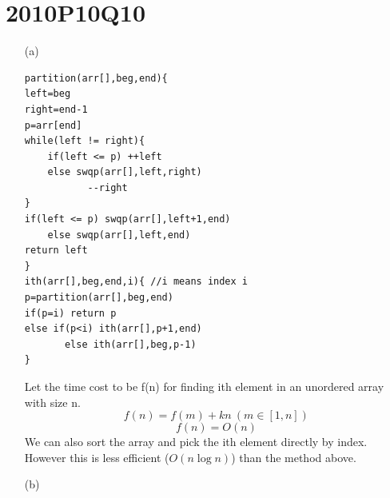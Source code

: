 \documentclass[10pt,twoside,a4paper]{article}
\begin{document}
\section{2010P10Q10}
\begin{itemize}
\item[(a)]
\begin{lstlisting}
partition(arr[],beg,end){
left=beg
right=end-1
p=arr[end]
while(left != right){
	if(left <= p) ++left
	else swqp(arr[],left,right)
		   --right
}
if(left <= p) swqp(arr[],left+1,end)
	else swqp(arr[],left,end)
return left
}
ith(arr[],beg,end,i){ //i means index i
p=partition(arr[],beg,end)
if(p=i) return p
else if(p<i) ith(arr[],p+1,end)
       else ith(arr[],beg,p-1)
}
\end{lstlisting}
Let the time cost to be f(n) for finding ith element in an unordered array with size n.
$$f(n)=f(m)+kn \  (m\in [1,n])$$
$$f(n)=O(n)$$
We can also sort the array and pick the ith element directly by index. However this is less efficient ($O(n\log n)$) than the method above.\\
\item[(b)]
\begin{itemize}


\end{itemize}
\end{itemize}
\end{document}
